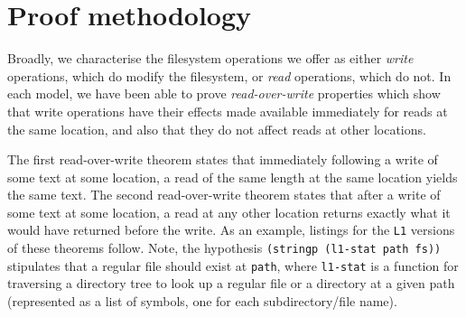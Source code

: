 \documentclass[submission,copyright,creativecommons]{eptcs}
\begin{document}



\section{Proof methodology}

Broadly, we characterise the filesystem
operations we offer as either \textit{write} operations, which do
modify the filesystem, or \textit{read} operations, which do not. In
each model, we have been able to prove \textit{read-over-write}
properties which show that write operations have
their effects made available immediately for reads at the same
location, and also that they do not affect reads at other locations.

The first read-over-write theorem states that immediately following a
write of some text at some location, a read of the same length at the
same location yields the same text. The second read-over-write
theorem states that after a write of some text at some location, a
read at any other location returns exactly what it would have returned
before the write. As an example, listings for the \texttt{L1} versions
of these theorems follow. Note, the hypothesis \texttt{(stringp
  (l1-stat path fs))} stipulates that a regular file should exist at
\texttt{path}, where \texttt{l1-stat} is a function for traversing a
directory tree to look up a regular file or a directory at a given
path (represented as a list of symbols, one for each subdirectory/file
name).
\end{document}
